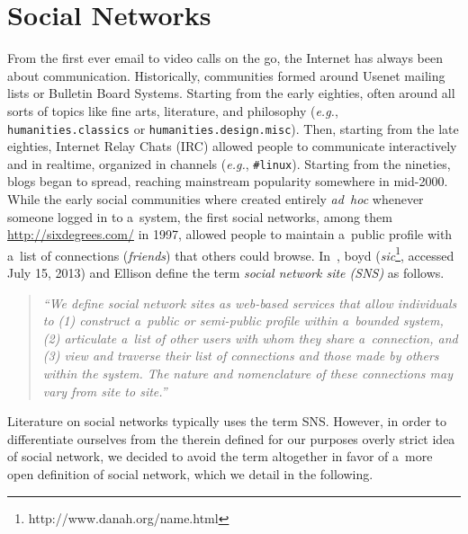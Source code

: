 \chapter{Social Networks}
\label{cha:social-networks}

\ifpdf
    \graphicspath{{3_social_networks/figures/PNG/}{3_social_networks/figures/PDF/}{3_social_networks/figures/}}
\else
    \graphicspath{{3_social_networks/figures/EPS/}{3_social_networks/figures/}}
\fi

From the first ever email to video calls on the go,
the Internet has always been about communication.
Historically, communities formed around Usenet mailing lists or Bulletin Board Systems.
Starting from the early eighties,
often around all sorts of topics like fine arts,
literature, and philosophy (\emph{e.g.}, \texttt{humanities.classics}
or \texttt{humanities.\-design.misc}).
Then, starting from the late eighties, Internet Relay Chats (IRC)
allowed people to communicate interactively and in realtime,
organized in channels (\emph{e.g.}, \texttt{\#linux}).
Starting from the nineties, blogs began to spread,
reaching mainstream popularity somewhere in mid-2000.
While the early social communities
where created entirely \emph{ad~hoc}
whenever someone logged in to a~system,
the first social networks,
among them \url{http://sixdegrees.com/} in 1997,
allowed people to maintain a~public profile
with a~list of connections (\emph{friends})
that others could browse.
In~\cite{boyd2007socialnetworksites}, boyd
(\emph{sic}\footnote{http://www.danah.org/name.html}, accessed July 15, 2013)
and Ellison define the term
\emph{social network site (SNS)} as follows.

\begin{quotation}
  \textit{``We define social network sites as web-based services
  that allow individuals to
  (1) construct a~public or
  semi-public profile within a~bounded system,
  (2) articulate a~list of other users
  with whom they share a~connection, and
  (3) view and traverse their list of connections
  and those made by others within the system.
  The nature and nomenclature of these connections
  may vary from site to site.''}
\end{quotation}

Literature on social networks typically uses the term SNS.
However, in order to differentiate ourselves
from the therein defined for our purposes overly strict
idea of social network,
we decided to avoid the term altogether in favor of a~more open
definition of social network,
which we detail in the following.


